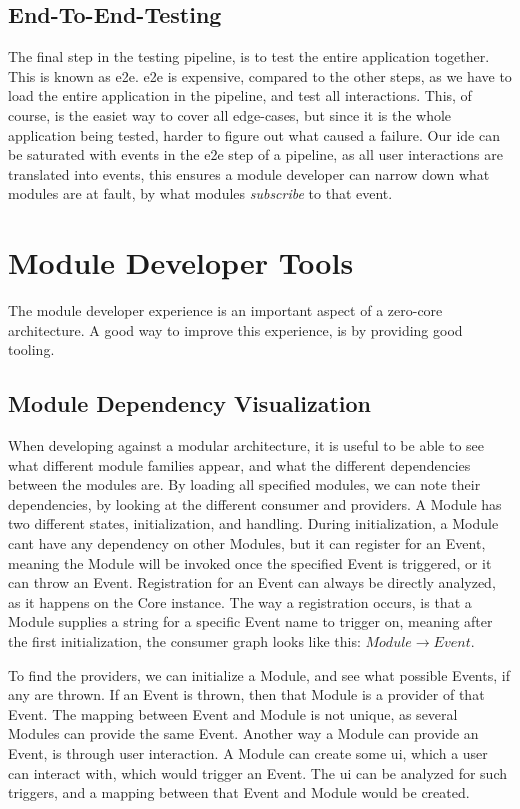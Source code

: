 \subsection{End-To-End-Testing}

The final step in the testing pipeline, is to test the entire application
together. This is known as \gls{e2e}. \gls{e2e} is expensive, compared to the
other steps, as we have to load the entire application in the pipeline, and test
all interactions. This, of course, is the easiet way to cover all edge-cases, but
since it is the whole application being tested, harder to figure out what caused
a failure. Our \gls{ide} can be saturated with events in the \gls{e2e} step of a
pipeline, as all user interactions are translated into events, this ensures a
module developer can narrow down what modules are at fault, by what modules
\textit{subscribe} to that event.

\section{Module Developer Tools}

The module developer experience is an important aspect of a zero-core
architecture. A good way to improve this experience, is by providing good
tooling.

\subsection{Module Dependency Visualization}

When developing against a modular architecture, it is useful to be able to see
what different module families appear, and what the different dependencies
between the modules are. By loading all specified modules, we can note their
dependencies, by looking at the different consumer and providers. A Module has
two different states, initialization, and handling. During initialization, a
Module cant have any dependency on other Modules, but it can register for an
Event, meaning the Module will be invoked once the specified Event is triggered,
or it can throw an Event. Registration for an Event can always be directly
analyzed, as it happens on the Core instance. The way a registration occurs, is
that a Module supplies a string for a specific Event name to trigger on,
meaning after the first initialization, the consumer graph looks 
like this: $Module \to Event$.

To find the providers, we can initialize a Module, and see what possible
Events, if any are thrown. If an Event is thrown, then that Module is a
provider of that Event. The mapping between Event and Module is not unique,
as several Modules can provide the same Event. Another way a Module can
provide an Event, is through user interaction. A Module can create some
\gls{ui}, which a user can interact with, which would trigger an Event. The
\gls{ui} can be analyzed for such triggers, and a mapping between that Event and
Module would be created.

